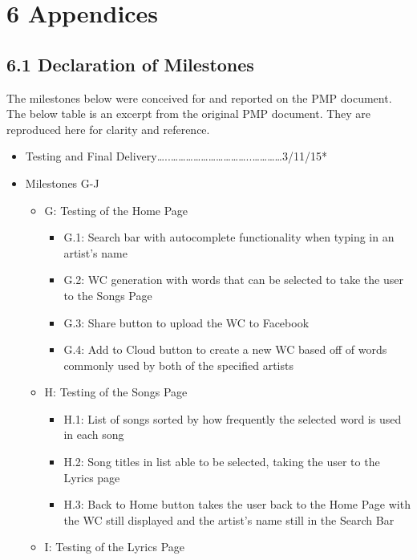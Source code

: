 \documentclass[]{article}
\begin{document}
\section{6 Appendices}\label{appendices}

\subsection{6.1 Declaration of
Milestones}\label{declaration-of-milestones}

The milestones below were conceived for and reported on the PMP
document. The below table is an excerpt from the original PMP document.
They are reproduced here for clarity and reference.

\begin{itemize}
\itemsep1pt\parskip0pt
\item
  Testing and Final
  Delivery\ldots{}..\ldots{}\ldots{}\ldots{}\ldots{}\ldots{}\ldots{}\ldots{}\ldots{}\ldots{}\ldots{}..\ldots{}\ldots{}\ldots{}\ldots{}3/11/15*
\item
  Milestones G-J

  \begin{itemize}
  \itemsep1pt\parskip0pt
  \item
    G: Testing of the Home Page

    \begin{itemize}
    \itemsep1pt\parskip0pt
    \item
      G.1: Search bar with autocomplete functionality when typing in an
      artist's name
    \item
      G.2: WC generation with words that can be selected to take the
      user to the Songs Page
    \item
      G.3: Share button to upload the WC to Facebook
    \item
      G.4: Add to Cloud button to create a new WC based off of words
      commonly used by both of the specified artists
    \end{itemize}
  \item
    H: Testing of the Songs Page

    \begin{itemize}
    \itemsep1pt\parskip0pt
    \item
      H.1: List of songs sorted by how frequently the selected word is
      used in each song
    \item
      H.2: Song titles in list able to be selected, taking the user to
      the Lyrics page
    \item
      H.3: Back to Home button takes the user back to the Home Page with
      the WC still displayed and the artist's name still in the Search
      Bar
    \end{itemize}
  \item
    I: Testing of the Lyrics Page


\end{itemize}
\end{itemize}
\end{document}
